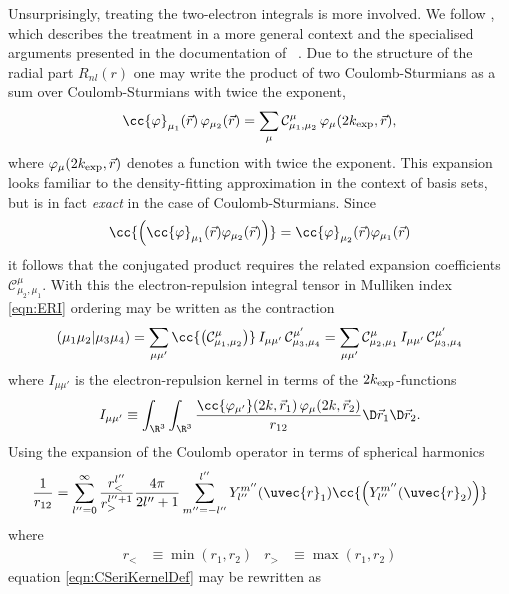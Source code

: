 Unsurprisingly, treating the two-electron integrals is more involved.
We follow \cite{Avery2015},
which describes the treatment in a more general context
and the specialised arguments presented in the documentation of
\sturmint~\cite{sturmintWeb}.
Due to the structure of the radial part $R_{nl}(r)$
one may write the product of two Coulomb-Sturmians as a
sum over Coulomb-Sturmians with twice the exponent, \ie
\newcommand{\csC}{\mathcal{C}}
\begin{equation}
	\cc{\varphi}_{\mu_1}(\vec{r}) \, \varphi_{\mu_2}(\vec{r})
	= \sum_{\mu} \csC^\mu_{\mu_1,\mu_2} \, \varphi_{\mu}(2\kexp, \vec{r}),
	\label{eqn:CSshellpairExpansion}
\end{equation}
where $\varphi_{\mu}(2k_\text{exp}, \vec{r})$ denotes a \CS function
with twice the exponent.
This expansion looks familiar to the density-fitting approximation
in the context of \cGTO basis sets,
but is in fact \emph{exact} in the case of Coulomb-Sturmians.
Since
\[ \cc{\left( \cc{\varphi}_{\mu_1}(\vec{r}) \varphi_{\mu_2}(\vec{r}) \right)} =
\cc{\varphi}_{\mu_2}(\vec{r}) \varphi_{\mu_1}(\vec{r}) \]
it follows that the conjugated product requires the related
expansion coefficients $\csC^\mu_{\mu_2,\mu_1}$.
With this the electron-repulsion integral tensor in Mulliken index \eqref{eqn:ERI}
ordering may be written as the contraction
\begin{equation}
	\eriMu{\mu_1\mu_2}{\mu_3\mu_4}
		= \sum_{\mu\mu'} \cc{\left(\csC^\mu_{\mu_1,\mu_2}\right)} \,
		I_{\mu\mu'} \, \csC^{\mu'}_{\mu_3,\mu_4}
		= \sum_{\mu\mu'} \csC^\mu_{\mu_2,\mu_1} \,
		I_{\mu\mu'} \, \csC^{\mu'}_{\mu_3,\mu_4}
	\label{eqn:CSeriContraction}
\end{equation}
where $I_{\mu\mu'}$ is the electron-repulsion kernel in terms of the $2k_\text{exp}$-functions
\begin{equation}
	I_{\mu\mu'} \equiv
	\int_{\R^3} \int_{\R^3}
	\frac{
	\cc{\varphi_{\mu'}}(2k,\vec{r}_1) \,
	\varphi_{\mu}(2k,\vec{r}_2)
	}{r_{12}}
	\D\vec{r}_1 \D\vec{r}_2.
	\label{eqn:CSeriKernelDef}
\end{equation}
Using the expansion of the Coulomb operator
in terms of spherical harmonics~\cite{Avery2018}
\[ \frac{1}{r_{12}} = \sum_{l''=0}^\infty
	\frac{r^{l''}_<}{r_>^{l'' + 1}} \frac{4\pi}{2l'' + 1}
	\sum_{m''=-{l''}}^{l''} Y_{l''}^{m''}(\uvec{r}_1)
	\cc{\left(Y_{l''}^{m''}(\uvec{r}_2)\right)}
\]
where
\begin{align*}
	r_< &\equiv \min(r_1, r_2) & r_> &\equiv \max(r_1, r_2)
\end{align*}
equation \eqref{eqn:CSeriKernelDef} may be rewritten as
